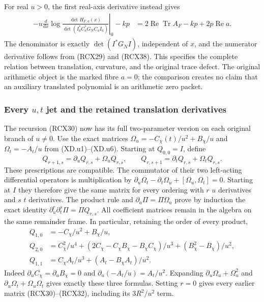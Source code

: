 For real \(u>0\), the first real-axis derivative instead gives
\[
\begin{split}
 -u\left.\frac d{dx}
   \log\frac{\det H_{F,a}(x)}
                 {\det(I_a^*C_a^*G_NC_aI_a)}\right|_0-kp
   &=2\operatorname{Re}\operatorname{Tr}A_F-kp
       +2p\operatorname{Re}a .
\end{split}\tag{RCX39}
\]
The denominator is exactly \(\det(I^*G_NI)\), independent of
\(x\), and the numerator derivative follows from (RCX29) and
(RCX38). This specifies the complete relation between translation,
curvature, and the original trace defect. The original arithmetic
object is the marked fibre \(a=0\); the comparison creates no claim
that an auxiliary translated polynomial is an arithmetic zero packet.


\subsubsection{Every $u,t$ jet and the retained translation derivatives}
The recursion (RCX30) now has its full two-parameter version on
each original branch of $u\ne0$.  Use the exact matrices
$\Omega_u=-C_\chi(t)/u^2+B_\chi/u$ and
$\Omega_t=-A_t/u$ from (XD.u1)--(XD.u6).  Starting at
$Q_{0,0}=I$, define
\[
 Q_{r+1,s}=\partial_uQ_{r,s}+\Omega_uQ_{r,s},\qquad
 Q_{r,s+1}=\partial_tQ_{r,s}+\Omega_tQ_{r,s}.          \tag{RCX.u1}
\]
These prescriptions are compatible.  The commutator of their
two left-acting differential operators is multiplication by
$\partial_u\Omega_t-\partial_t\Omega_u+
[\Omega_u,\Omega_t]=0$.  Starting at $I$ they therefore give
the same matrix for every ordering with $r$ $u$ derivatives
and $s$ $t$ derivatives.  The product rule and
$\partial_a\Pi=\Pi\Omega_a$ prove by induction the exact
identity
$\partial_u^r\partial_t^s\Pi=\Pi Q_{r,s}$.
All coefficient matrices remain in the algebra on the same
remainder frame.  In particular, retaining the order of
every product,
\[
 \begin{split}
 Q_{1,0}&=-C_\chi/u^2+B_\chi/u,\\
 Q_{2,0}&=C_\chi^2/u^4+
       (2C_\chi-C_\chi B_\chi-B_\chi C_\chi)/u^3
                         +(B_\chi^2-B_\chi)/u^2,\\
 Q_{1,1}&=C_\chi A_t/u^3+(A_t-B_\chi A_t)/u^2.
 \end{split}                                      \tag{RCX.u2}
\]
Indeed $\partial_uC_\chi=\partial_uB_\chi=0$ and
$\partial_u(-A_t/u)=A_t/u^2$.  Expanding
$\partial_u\Omega_u+\Omega_u^2$ and
$\partial_u\Omega_t+\Omega_u\Omega_t$ gives exactly
these three formulas.  Setting $r=0$ gives every earlier
matrix (RCX30)--(RCX32), including its $3R^2/u^2$ term.

